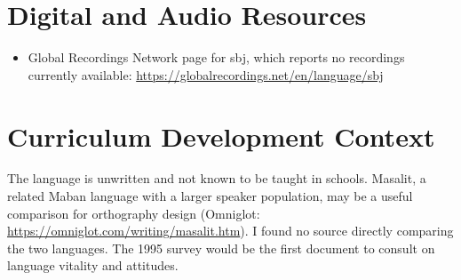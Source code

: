 \documentclass[12pt]{article}
\begin{document}
\section{Digital and Audio Resources}
\begin{itemize}
\item Global Recordings Network page for sbj, which reports no recordings currently available: \url{https://globalrecordings.net/en/language/sbj}
\end{itemize}

\section{Curriculum Development Context}
The language is unwritten and not known to be taught in schools. Masalit, a related Maban language with a larger speaker population, may be a useful comparison for orthography design (Omniglot: \url{https://omniglot.com/writing/masalit.htm}). I found no source directly comparing the two languages. The 1995 survey would be the first document to consult on language vitality and attitudes.
\end{document}
